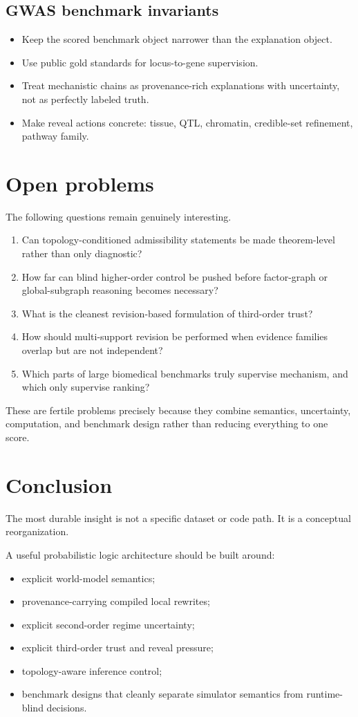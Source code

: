 \documentclass[11pt]{article}
\begin{document}
\subsection*{GWAS benchmark invariants}
\begin{itemize}
    \item Keep the scored benchmark object narrower than the explanation object.
    \item Use public gold standards for locus-to-gene supervision.
    \item Treat mechanistic chains as provenance-rich explanations with uncertainty, not as perfectly labeled truth.
    \item Make reveal actions concrete: tissue, QTL, chromatin, credible-set refinement, pathway family.
\end{itemize}

\section{Open problems}
The following questions remain genuinely interesting.
\begin{enumerate}[label=\arabic*.]
    \item Can topology-conditioned admissibility statements be made theorem-level rather than only diagnostic?
    \item How far can blind higher-order control be pushed before factor-graph or global-subgraph reasoning becomes necessary?
    \item What is the cleanest revision-based formulation of third-order trust?
    \item How should multi-support revision be performed when evidence families overlap but are not independent?
    \item Which parts of large biomedical benchmarks truly supervise mechanism, and which only supervise ranking?
\end{enumerate}

These are fertile problems precisely because they combine semantics, uncertainty, computation, and benchmark design rather than reducing everything to one score.

\section{Conclusion}
The most durable insight is not a specific dataset or code path. It is a conceptual reorganization.

A useful probabilistic logic architecture should be built around:
\begin{itemize}
    \item explicit world-model semantics;
    \item provenance-carrying compiled local rewrites;
    \item explicit second-order regime uncertainty;
    \item explicit third-order trust and reveal pressure;
    \item topology-aware inference control;
    \item benchmark designs that cleanly separate simulator semantics from runtime-blind decisions.
\end{itemize}
\end{document}
